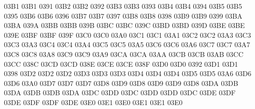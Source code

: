 \setcclcucx 03B1 03B1 0391 %
\setcclcucx 03B2 03B2 0392 %
\setcclcucx 03B3 03B3 0393 %
\setcclcucx 03B4 03B4 0394 %
\setcclcucx 03B5 03B5 0395 %
\setcclcucx 03B6 03B6 0396 %
\setcclcucx 03B7 03B7 0397 %
\setcclcucx 03B8 03B8 0398 %
\setcclcucx 03B9 03B9 0399 %
\setcclcucx 03BA 03BA 039A %
\setcclcucx 03BB 03BB 039B %
\setcclcucx 03BC 03BC 039C %
\setcclcucx 03BD 03BD 039D %
\setcclcucx 03BE 03BE 039E %
\setcclcucx 03BF 03BF 039F %
\setcclcucx 03C0 03C0 03A0 %
\setcclcucx 03C1 03C1 03A1 %
\setcclcucx 03C2 03C2 03A3 %
\setcclcucx 03C3 03C3 03A3 %
\setcclcucx 03C4 03C4 03A4 %
\setcclcucx 03C5 03C5 03A5 %
\setcclcucx 03C6 03C6 03A6 %
\setcclcucx 03C7 03C7 03A7 %
\setcclcucx 03C8 03C8 03A8 %
\setcclcucx 03C9 03C9 03A9 %
\setcclcucx 03CA 03CA 03AA %
\setcclcucx 03CB 03CB 03AB %
\setcclcucx 03CC 03CC 038C %
\setcclcucx 03CD 03CD 038E %
\setcclcucx 03CE 03CE 038F %
\setcclcucx 03D0 03D0 0392 %
\setcclcucx 03D1 03D1 0398 %
\setcclcucx 03D2 03D2 03D2 %
\setcclcucx 03D3 03D3 03D3 %
\setcclcucx 03D4 03D4 03D4 %
\setcclcucx 03D5 03D5 03A6 %
\setcclcucx 03D6 03D6 03A0 %
\setcclcucx 03D7 03D7 03D7 %
\setcclcucx 03D8 03D9 03D8 %
\setcclcucx 03D9 03D9 03D8 %
\setcclcucx 03DA 03DB 03DA %
\setcclcucx 03DB 03DB 03DA %
\setcclcucx 03DC 03DD 03DC %
\setcclcucx 03DD 03DD 03DC %
\setcclcucx 03DE 03DF 03DE %
\setcclcucx 03DF 03DF 03DE %
\setcclcucx 03E0 03E1 03E0 %
\setcclcucx 03E1 03E1 03E0 %
